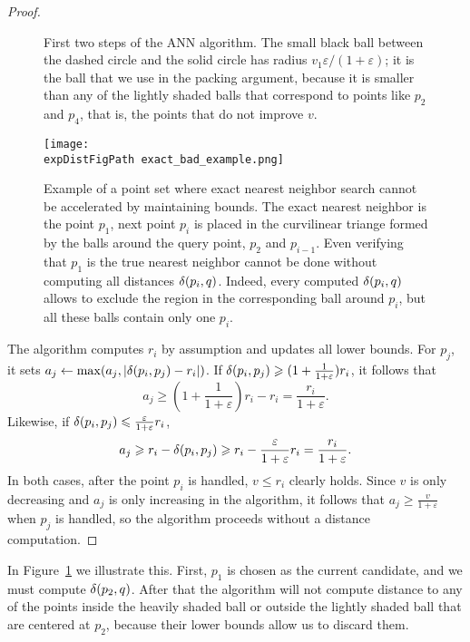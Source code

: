 \documentclass{ws-ijcga}
\renewcommand{\leq}{\leqslant}
\renewcommand{\geq}{\geqslant}
\newcommand{\eps}{\varepsilon}
\def \expDistFigPath {pics/}
\begin{document}
\begin{proof}
\begin{figure}[ht!]
\caption{First two steps of the ANN algorithm. 
The small black ball between the dashed circle and the solid circle has radius $v_1 \eps / (1 + \eps)$; it is the ball that we use in the packing argument, because it is smaller than any of the lightly shaded balls that correspond to points like $p_2$ and $p_4$, that is, the points that do not improve $v$.}
\label{fig:ann_illustration}
\end{figure}


\begin{figure}[hb!]
    \texttt{[image: \\expDistFigPath exact\_bad\_example.png]}
    \caption{Example of a point set where exact nearest neighbor search cannot be accelerated by maintaining bounds.
    The exact nearest neighbor is the point $p_1$, next point $p_i$ is placed 
    in the curvilinear triange formed by the balls around the query point, $p_2$ and $p_{i-1}$. Even verifying that $p_1$
    is the true nearest neighbor cannot be done without computing all distances $\delta(p_i,q)$. Indeed, every computed
    $\delta(p_i,q)$ allows to exclude the region in the corresponding ball around $p_i$, but all these balls contain only one $p_i$.}
    \label{fig:exact_bad_example}
\end{figure}


The algorithm computes $r_i$ by assumption and updates
all lower bounds. For $p_j$, it sets $a_j\gets \max (a_j,|\delta(p_i,p_j)-r_i|)$.
If $\dist(p_i,p_j)\geq (1+\frac{1}{1+\eps})r_i$, it follows that 
\[a_j\geq (1+\frac{1}{1+\eps})r_i - r_i = \frac{r_i}{1+\eps}.\]
Likewise, if $\dist(p_i,p_j)\leq\frac{\eps}{1+\eps}r_i$,
\[a_j\geq r_i-\dist(p_i,p_j) \geq r_i - \frac{\eps}{1+\eps}r_i = \frac{r_i}{1+\eps}.\]
In both cases, after the point $p_i$ is handled,
$v\leq r_i$ clearly holds. Since $v$ is only decreasing
and $a_j$ is only increasing in the algorithm,
it follows that $a_j\geq \frac{v}{1+\eps}$ when $p_j$ is handled,
so the algorithm proceeds without a distance computation.
\end{proof}

In Figure~\ref{fig:ann_illustration} we illustrate this. First, $p_1$ is
chosen as the current candidate, and we must compute $\delta(p_2, q)$.
After that the algorithm will not compute
distance to any of the points inside the heavily shaded ball or outside
the lightly shaded ball that are centered at $p_2$,
because their lower bounds allow us to discard them.
\end{document}
